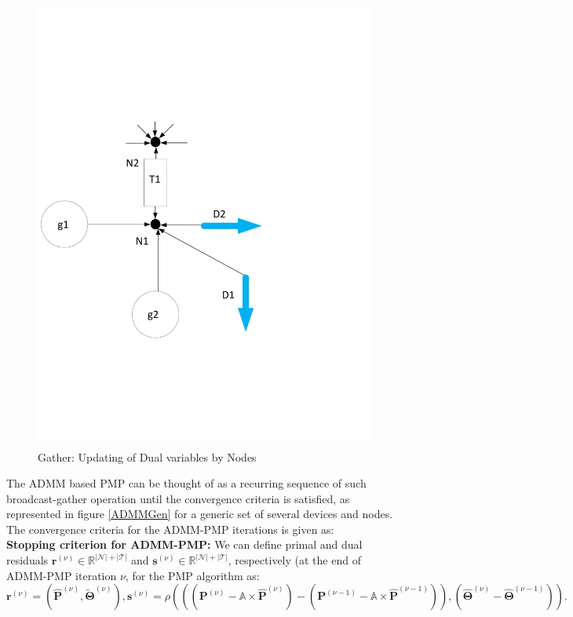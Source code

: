 \documentclass[preprint,12pt,3p]{elsarticle}
\begin{document}
	\begin{figure}
		\begin{center}
			\vspace*{-4cm}
			\includegraphics[height=15cm,width=20cm]{Prox_OPF2.pdf}
			\caption{Gather: Updating of Dual variables by Nodes}
			\label{Gather}
		\end{center}
	\end{figure}
	The ADMM based PMP can be thought of as a recurring sequence of such broadcast-gather operation until the convergence criteria is satisfied, as represented in figure \ref{ADMMGen} for a generic set of several devices and nodes. The convergence criteria for the ADMM-PMP iterations is given as:\\
	\textbf{Stopping criterion for ADMM-PMP: }We can define primal and dual residuals ${\mathbf{r}}^{(\nu)}\in\mathbb{R}^{|\mathcal{N}|+|\mathcal{T}|}$ and ${\mathbf{s}}^{(\nu)}\in\mathbb{R}^{|\mathcal{N}|+|\mathcal{T}|}$, respectively (at the end of ADMM-PMP iteration $\nu$, for the
	PMP algorithm as:
	\[
	{\mathbf{r}}^{(\nu)} = \left(\hat {\mathbf{P}}^{(\nu)}, \tilde{\mathbf{\Theta}}^{(\nu)}\right),
	{\mathbf{s}}^{(\nu)} = \rho\left((({\mathbf{P}}^{(\nu)} - \mathbb{A}\times\hat {\mathbf{P}}^{(\nu)}) - ({\mathbf{P}}^{(\nu-1)} - \mathbb{A}\times\hat {\mathbf{P}}^{(\nu-1)})), (\hat {\mathbf{\Theta}}^{(\nu)}- \hat {\mathbf{\Theta}}^{(\nu-1)})\right).
	\]
\end{document}
